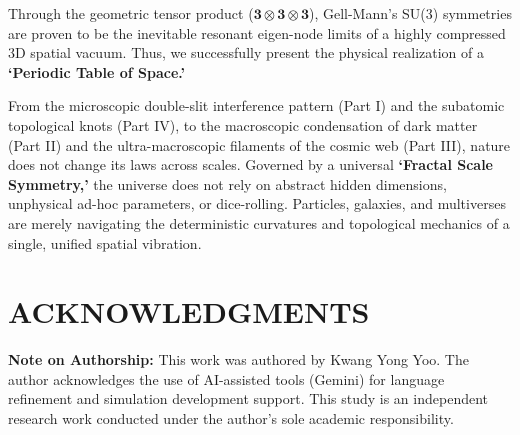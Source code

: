 \documentclass[reprint,amsmath,amssymb,aps,prd]{revtex4-2}
\begin{document}
Through the geometric tensor product ($\mathbf{3} \otimes \mathbf{3} \otimes \mathbf{3}$), Gell-Mann's SU(3) symmetries \cite{GellMann1964} are proven to be the inevitable resonant eigen-node limits of a highly compressed 3D spatial vacuum. Thus, we successfully present the physical realization of a \textbf{`Periodic Table of Space.'}

From the microscopic double-slit interference pattern (Part I) and the subatomic topological knots (Part IV), to the macroscopic condensation of dark matter (Part II) and the ultra-macroscopic filaments of the cosmic web (Part III), nature does not change its laws across scales. Governed by a universal \textbf{`Fractal Scale Symmetry,'} the universe does not rely on abstract hidden dimensions, unphysical ad-hoc parameters, or dice-rolling. Particles, galaxies, and multiverses are merely navigating the deterministic curvatures and topological mechanics of a single, unified spatial vibration.

\vspace{1em}
\section*{ACKNOWLEDGMENTS}
\textbf{Note on Authorship:} This work was authored by Kwang Yong Yoo. The author acknowledges the use of AI-assisted tools (Gemini) for language refinement and simulation development support. This study is an independent research work conducted under the author's sole academic responsibility.
\end{document}
